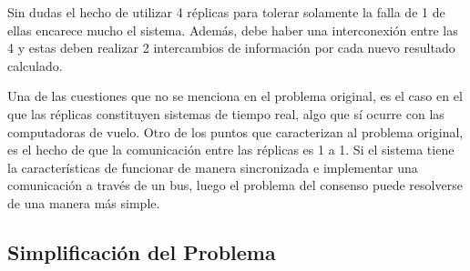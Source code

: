 Sin dudas el hecho de utilizar 4 réplicas para tolerar solamente la falla de 1 de ellas encarece mucho el sistema. Además, debe haber una interconexión entre las 4 y estas deben realizar 2 intercambios de información por cada nuevo resultado calculado.

Una de las cuestiones que no se menciona en el problema original, es el caso en el que las réplicas constituyen sistemas de tiempo real, algo que sí ocurre con las computadoras de vuelo. Otro de los puntos que caracterizan al problema original, es el hecho de que la comunicación entre las réplicas es 1 a 1. Si el sistema tiene la características de funcionar de manera sincronizada e implementar una comunicación a través de un bus, luego el problema del consenso puede resolverse de una manera más simple.





\subsection{Simplificación del Problema}


